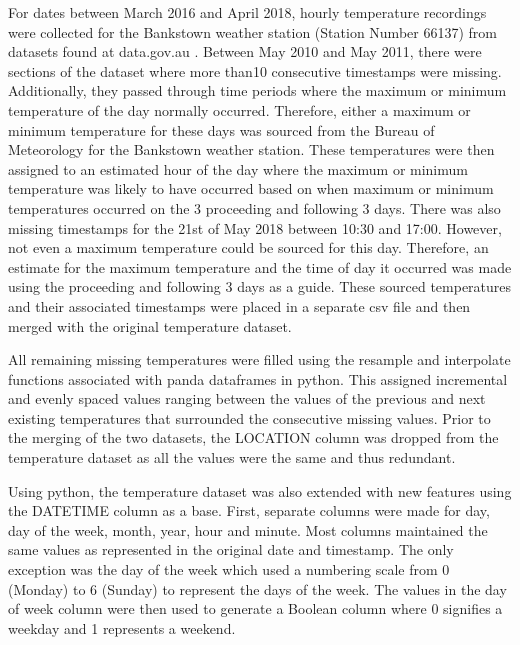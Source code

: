 \documentclass[mstat,12pt]{unswthesis}
\begin{document}
\bigskip

For dates between March 2016 and April 2018, hourly temperature
recordings were collected for the Bankstown weather station (Station
Number 66137) from datasets found at data.gov.au \cite{DATAGOV}. Between
May 2010 and May 2011, there were sections of the dataset where more
than10 consecutive timestamps were missing. Additionally, they passed
through time periods where the maximum or minimum temperature of the day
normally occurred. Therefore, either a maximum or minimum temperature
for these days was sourced from the Bureau of Meteorology \cite{BOM} for
the Bankstown weather station. These temperatures were then assigned to
an estimated hour of the day where the maximum or minimum temperature
was likely to have occurred based on when maximum or minimum
temperatures occurred on the 3 proceeding and following 3 days. There
was also missing timestamps for the 21st of May 2018 between 10:30 and
17:00. However, not even a maximum temperature could be sourced for this
day. Therefore, an estimate for the maximum temperature and the time of
day it occurred was made using the proceeding and following 3 days as a
guide. These sourced temperatures and their associated timestamps were
placed in a separate csv file and then merged with the original
temperature dataset.

\bigskip

All remaining missing temperatures were filled using the resample and
interpolate functions associated with panda dataframes in python. This
assigned incremental and evenly spaced values ranging between the values
of the previous and next existing temperatures that surrounded the
consecutive missing values. Prior to the merging of the two datasets,
the LOCATION column was dropped from the temperature dataset as all the
values were the same and thus redundant.

\bigskip

Using python, the temperature dataset was also extended with new
features using the DATETIME column as a base. First, separate columns
were made for day, day of the week, month, year, hour and minute. Most
columns maintained the same values as represented in the original date
and timestamp. The only exception was the day of the week which used a
numbering scale from 0 (Monday) to 6 (Sunday) to represent the days of
the week. The values in the day of week column were then used to
generate a Boolean column where 0 signifies a weekday and 1 represents a
weekend.

\bigskip
\end{document}
